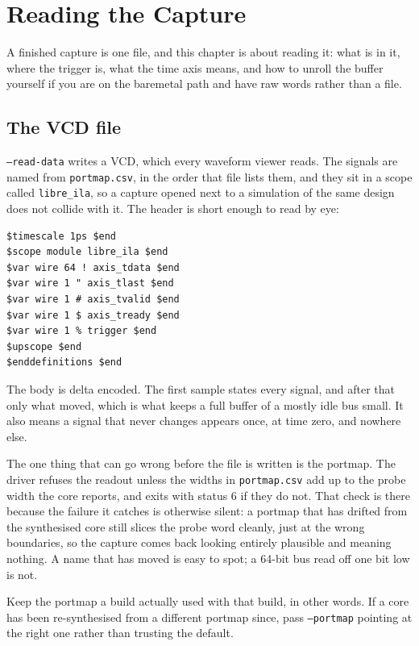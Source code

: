 \documentclass[../manual.tex]{subfiles}
\begin{document}
\chapter{Reading the Capture}
\label{ch:reading}

A finished capture is one file, and this chapter is about reading it: what is in it, where the trigger is, what the time axis means, and how to unroll the buffer yourself if you are on the baremetal path and have raw words rather than a file.

\section{The VCD file}
\label{sec:read_vcd}

\texttt{--read-data} writes a VCD, which every waveform viewer reads. The signals are named from \texttt{portmap.csv}, in the order that file lists them, and they sit in a scope called \texttt{libre\_ila}, so a capture opened next to a simulation of the same design does not collide with it. The header is short enough to read by eye:

\begin{lstlisting}
$timescale 1ps $end
$scope module libre_ila $end
$var wire 64 ! axis_tdata $end
$var wire 1 " axis_tlast $end
$var wire 1 # axis_tvalid $end
$var wire 1 $ axis_tready $end
$var wire 1 % trigger $end
$upscope $end
$enddefinitions $end
\end{lstlisting}

The body is delta encoded. The first sample states every signal, and after that only what moved, which is what keeps a full buffer of a mostly idle bus small. It also means a signal that never changes appears once, at time zero, and nowhere else.

The one thing that can go wrong before the file is written is the portmap. The driver refuses the readout unless the widths in \texttt{portmap.csv} add up to the probe width the core reports, and exits with status 6 if they do not. That check is there because the failure it catches is otherwise silent: a portmap that has drifted from the synthesised core still slices the probe word cleanly, just at the wrong boundaries, so the capture comes back looking entirely plausible and meaning nothing. A name that has moved is easy to spot; a 64-bit bus read off one bit low is not.

Keep the portmap a build actually used with that build, in other words. If a core has been re-synthesised from a different portmap since, pass \texttt{--portmap} pointing at the right one rather than trusting the default.
\end{document}

